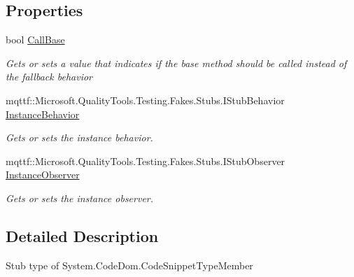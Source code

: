 \subsection*{Properties}
\begin{DoxyCompactItemize}
\item 
bool \hyperlink{class_system_1_1_code_dom_1_1_fakes_1_1_stub_code_snippet_type_member_a3611c378f3e7a7c4a58830dbf69a6ba6}{Call\-Base}
\begin{DoxyCompactList}\small\item\em Gets or sets a value that indicates if the base method should be called instead of the fallback behavior\end{DoxyCompactList}\item 
mqttf\-::\-Microsoft.\-Quality\-Tools.\-Testing.\-Fakes.\-Stubs.\-I\-Stub\-Behavior \hyperlink{class_system_1_1_code_dom_1_1_fakes_1_1_stub_code_snippet_type_member_addbd5e383a4035fe0b8d62bf7bdcc059}{Instance\-Behavior}
\begin{DoxyCompactList}\small\item\em Gets or sets the instance behavior.\end{DoxyCompactList}\item 
mqttf\-::\-Microsoft.\-Quality\-Tools.\-Testing.\-Fakes.\-Stubs.\-I\-Stub\-Observer \hyperlink{class_system_1_1_code_dom_1_1_fakes_1_1_stub_code_snippet_type_member_a734291bb2a9da2a9c535dfe8c261d089}{Instance\-Observer}
\begin{DoxyCompactList}\small\item\em Gets or sets the instance observer.\end{DoxyCompactList}\end{DoxyCompactItemize}


\subsection{Detailed Description}
Stub type of System.\-Code\-Dom.\-Code\-Snippet\-Type\-Member



